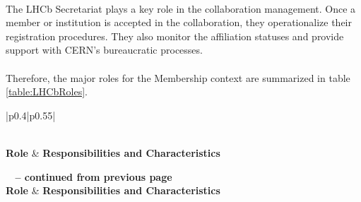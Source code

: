 \paragraph{} The LHCb Secretariat plays a key role in the collaboration management. Once a member or institution is accepted in the collaboration, they operationalize their registration procedures.  They also monitor the affiliation statuses and provide support with CERN's bureaucratic processes.

\paragraph{} Therefore, the major roles for the Membership context are summarized in table \ref{table:LHCbRoles}.


\begin{longtable}{|p{}|p{}|}
\caption{Major roles in LHCb for the Membership}\label{table:LHCbRoles} \\
\hline
\textbf{Role} & \textbf{Responsibilities and Characteristics} \\ \hline
\endfirsthead

%
{{\bfseries \tablename\ \thetable{} -- continued from previous page}} \\
\hline
\textbf{Role} & \textbf{Responsibilities and Characteristics} \\
\hline
\endhead


\end{longtable}
